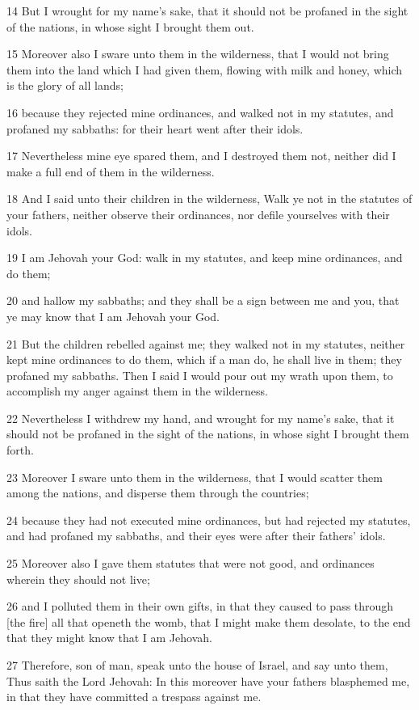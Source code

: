 \par 14 But I wrought for my name's sake, that it should not be profaned in the sight of the nations, in whose sight I brought them out.
\par 15 Moreover also I sware unto them in the wilderness, that I would not bring them into the land which I had given them, flowing with milk and honey, which is the glory of all lands;
\par 16 because they rejected mine ordinances, and walked not in my statutes, and profaned my sabbaths: for their heart went after their idols.
\par 17 Nevertheless mine eye spared them, and I destroyed them not, neither did I make a full end of them in the wilderness.
\par 18 And I said unto their children in the wilderness, Walk ye not in the statutes of your fathers, neither observe their ordinances, nor defile yourselves with their idols.
\par 19 I am Jehovah your God: walk in my statutes, and keep mine ordinances, and do them;
\par 20 and hallow my sabbaths; and they shall be a sign between me and you, that ye may know that I am Jehovah your God.
\par 21 But the children rebelled against me; they walked not in my statutes, neither kept mine ordinances to do them, which if a man do, he shall live in them; they profaned my sabbaths. Then I said I would pour out my wrath upon them, to accomplish my anger against them in the wilderness.
\par 22 Nevertheless I withdrew my hand, and wrought for my name's sake, that it should not be profaned in the sight of the nations, in whose sight I brought them forth.
\par 23 Moreover I sware unto them in the wilderness, that I would scatter them among the nations, and disperse them through the countries;
\par 24 because they had not executed mine ordinances, but had rejected my statutes, and had profaned my sabbaths, and their eyes were after their fathers' idols.
\par 25 Moreover also I gave them statutes that were not good, and ordinances wherein they should not live;
\par 26 and I polluted them in their own gifts, in that they caused to pass through [the fire] all that openeth the womb, that I might make them desolate, to the end that they might know that I am Jehovah.
\par 27 Therefore, son of man, speak unto the house of Israel, and say unto them, Thus saith the Lord Jehovah: In this moreover have your fathers blasphemed me, in that they have committed a trespass against me.
